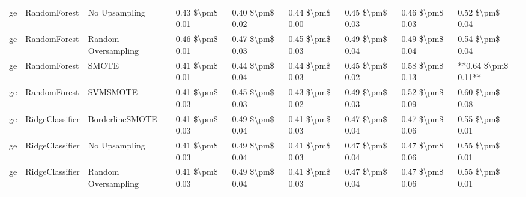 \begin{tabular}{lllllllll}
      ge &                    RandomForest &                 No Upsampling & 0.43 \$\textbackslash pm\$ 0.01 &           0.40 \$\textbackslash pm\$ 0.02 &       0.44 \$\textbackslash pm\$ 0.00 &        0.45 \$\textbackslash pm\$ 0.03 &                         0.46 \$\textbackslash pm\$ 0.03 &     0.52 \$\textbackslash pm\$ 0.04 \\
      ge &                    RandomForest &           Random Oversampling & 0.46 \$\textbackslash pm\$ 0.01 &           0.47 \$\textbackslash pm\$ 0.03 &       0.45 \$\textbackslash pm\$ 0.03 &        0.49 \$\textbackslash pm\$ 0.04 &                         0.49 \$\textbackslash pm\$ 0.04 &     0.54 \$\textbackslash pm\$ 0.04 \\
      ge &                    RandomForest &                         SMOTE & 0.41 \$\textbackslash pm\$ 0.01 &           0.44 \$\textbackslash pm\$ 0.04 &       0.44 \$\textbackslash pm\$ 0.03 &        0.45 \$\textbackslash pm\$ 0.02 &                         0.58 \$\textbackslash pm\$ 0.13 & **0.64 \$\textbackslash pm\$ 0.11** \\
      ge &                    RandomForest &                      SVMSMOTE & 0.41 \$\textbackslash pm\$ 0.03 &           0.45 \$\textbackslash pm\$ 0.03 &       0.43 \$\textbackslash pm\$ 0.02 &        0.49 \$\textbackslash pm\$ 0.03 &                         0.52 \$\textbackslash pm\$ 0.09 &     0.60 \$\textbackslash pm\$ 0.08 \\
      ge &                 RidgeClassifier &               BorderlineSMOTE & 0.41 \$\textbackslash pm\$ 0.03 &           0.49 \$\textbackslash pm\$ 0.04 &       0.41 \$\textbackslash pm\$ 0.03 &        0.47 \$\textbackslash pm\$ 0.04 &                         0.47 \$\textbackslash pm\$ 0.06 &     0.55 \$\textbackslash pm\$ 0.01 \\
      ge &                 RidgeClassifier &                 No Upsampling & 0.41 \$\textbackslash pm\$ 0.03 &           0.49 \$\textbackslash pm\$ 0.04 &       0.41 \$\textbackslash pm\$ 0.03 &        0.47 \$\textbackslash pm\$ 0.04 &                         0.47 \$\textbackslash pm\$ 0.06 &     0.55 \$\textbackslash pm\$ 0.01 \\
      ge &                 RidgeClassifier &           Random Oversampling & 0.41 \$\textbackslash pm\$ 0.03 &           0.49 \$\textbackslash pm\$ 0.04 &       0.41 \$\textbackslash pm\$ 0.03 &        0.47 \$\textbackslash pm\$ 0.04 &                         0.47 \$\textbackslash pm\$ 0.06 &     0.55 \$\textbackslash pm\$ 0.01 \\

\end{tabular}
